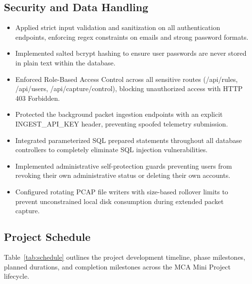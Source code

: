 \documentclass[a4paper,12pt]{report}
\begin{document}
	\subsection{Security and Data Handling}
	\begin{itemize}
		\item Applied strict input validation and sanitization on all authentication endpoints, enforcing regex constraints on emails and strong password formats.
		\item Implemented salted bcrypt hashing to ensure user passwords are never stored in plain text within the database.
		\item Enforced Role-Based Access Control across all sensitive routes (/api/rules, /api/users, /api/capture/control), blocking unauthorized access with HTTP 403 Forbidden.
		\item Protected the background packet ingestion endpoints with an explicit INGEST\_API\_KEY header, preventing spoofed telemetry submission.
		\item Integrated parameterized SQL prepared statements throughout all database controllers to completely eliminate SQL injection vulnerabilities.
		\item Implemented administrative self-protection guards preventing users from revoking their own administrative status or deleting their own accounts.
		\item Configured rotating PCAP file writers with size-based rollover limits to prevent unconstrained local disk consumption during extended packet capture.
	\end{itemize}
	
	\subsection{Project Schedule}
	\par
	Table~\ref{tab:schedule} outlines the project development timeline, phase milestones, planned durations, and completion milestones across the MCA Mini Project lifecycle.
	
\end{document}
